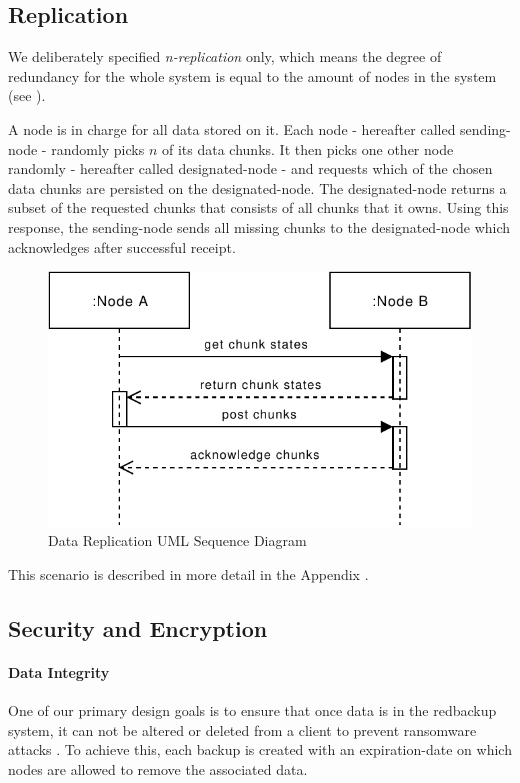 \subsection{Replication}

We deliberately specified \emph{n-replication} only, which means the degree of redundancy for the whole system is equal to the amount of \glspl{node} in the system (see ).

A \gls{node} is in charge for all data stored on it. Each \gls{node} - hereafter called \gls{sending-node} - randomly picks $n$ of its data \glspl{chunk}. It then picks one other \gls{node} randomly - hereafter called \gls{designated-node} - and requests which of the chosen data \glspl{chunk} are persisted on the \gls{designated-node}. The \gls{designated-node} returns a subset of the requested \glspl{chunk} that consists of all \glspl{chunk} that it owns. Using this response, the \gls{sending-node} sends all missing \glspl{chunk} to the \gls{designated-node} which acknowledges after successful receipt.

\begin{figure}[h]
    \centering
    \includegraphics[width=0.6\linewidth]{resources/data_replication.pdf}
    \caption{Data Replication UML Sequence Diagram}
\end{figure}

This scenario is described in more detail in the Appendix .

\subsection{Security and Encryption}\label{sec:security-and-encryption}
\paragraph{Data Integrity} One of our primary design goals is to ensure that once data is in the redbackup system, it can not be altered or deleted from a \gls{client} to prevent ransomware attacks \cite{young-cryptovirology}. To achieve this, each backup is created with an \gls{expiration-date} on which \glspl{node} are allowed to remove the associated data. 

